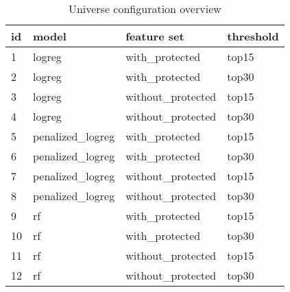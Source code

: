 \begin{table}
\caption{Universe configuration overview}
\label{tab:universe_summary}
\begin{tabular}{llll}
\toprule
id & model & feature set & threshold \\
\midrule
1 & logreg & with\_protected & top15 \\
2 & logreg & with\_protected & top30 \\
3 & logreg & without\_protected & top15 \\
4 & logreg & without\_protected & top30 \\
5 & penalized\_logreg & with\_protected & top15 \\
6 & penalized\_logreg & with\_protected & top30 \\
7 & penalized\_logreg & without\_protected & top15 \\
8 & penalized\_logreg & without\_protected & top30 \\
9 & rf & with\_protected & top15 \\
10 & rf & with\_protected & top30 \\
11 & rf & without\_protected & top15 \\
12 & rf & without\_protected & top30 \\
\bottomrule
\end{tabular}
\end{table}
